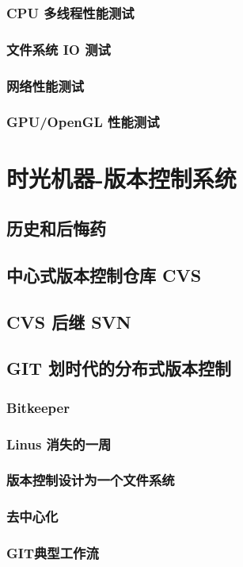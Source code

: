 \documentclass[amstex,twoside]{ctexbook}
\begin{document}
\subsection{  CPU 多线程性能测试}
\subsection{  文件系统 IO 测试}
\subsection{  网络性能测试}
\subsection{  GPU/OpenGL 性能测试}


\chapter{时光机器-版本控制系统}
\section{   历史和后悔药	}
\section{   中心式版本控制仓库 CVS	}
\section{   CVS 后继 SVN	}
\section{GIT 划时代的分布式版本控制\label{sec:git}}
\subsection{  Bitkeeper	}
\subsection{  Linus 消失的一周	}
\subsection{  版本控制设计为一个文件系统	}
\subsection{ 去中心化	}
\subsection{  GIT典型工作流	}
\end{document}
